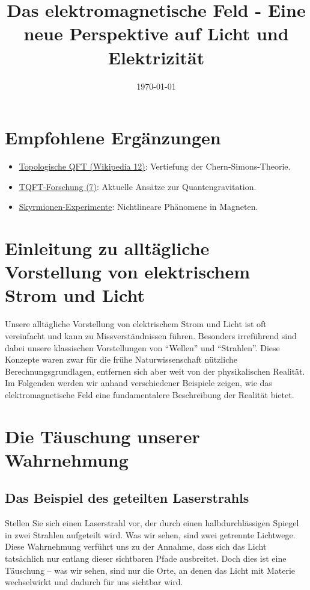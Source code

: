 \documentclass[12pt,a4paper]{article}
\begin{document}
	\section{Empfohlene Ergänzungen}
	\begin{itemize}
		\item \href{https://de.wikipedia.org/wiki/Topologische_Quantenfeldtheorie}{Topologische QFT (Wikipedia 12)}: Vertiefung der Chern-Simons-Theorie.
		\item \href{https://www.mathematik.uni-muenchen.de/~schotten/tqa/tqa_research_tftq.php}{TQFT-Forschung (7)}: Aktuelle Ansätze zur Quantengravitation.
		\item \href{https://doi.org/10.1038/nphys3268}{Skyrmionen-Experimente}: Nichtlineare Phänomene in Magneten.
	\end{itemize}
	


\title{Das elektromagnetische Feld - Eine neue Perspektive auf Licht und Elektrizität}
\author{}
\date{\today}


	
	\maketitle
	
	\section*{Einleitung zu alltägliche Vorstellung von elektrischem Strom und Licht }
	Unsere alltägliche Vorstellung von elektrischem Strom und Licht ist oft vereinfacht und kann zu Missverständnissen führen. Besonders irreführend sind dabei unsere klassischen Vorstellungen von ``Wellen'' und ``Strahlen''. Diese Konzepte waren zwar für die frühe Naturwissenschaft nützliche Berechnungsgrundlagen, entfernen sich aber weit von der physikalischen Realität. Im Folgenden werden wir anhand verschiedener Beispiele zeigen, wie das elektromagnetische Feld eine fundamentalere Beschreibung der Realität bietet.
	
	\section{Die Täuschung unserer Wahrnehmung}
	\subsection{Das Beispiel des geteilten Laserstrahls}
	Stellen Sie sich einen Laserstrahl vor, der durch einen halbdurchlässigen Spiegel in zwei Strahlen aufgeteilt wird. Was wir sehen, sind zwei getrennte Lichtwege. Diese Wahrnehmung verführt uns zu der Annahme, dass sich das Licht tatsächlich nur entlang dieser sichtbaren Pfade ausbreitet. Doch dies ist eine Täuschung -- was wir sehen, sind nur die Orte, an denen das Licht mit Materie wechselwirkt und dadurch für uns sichtbar wird.
	
\end{document}
